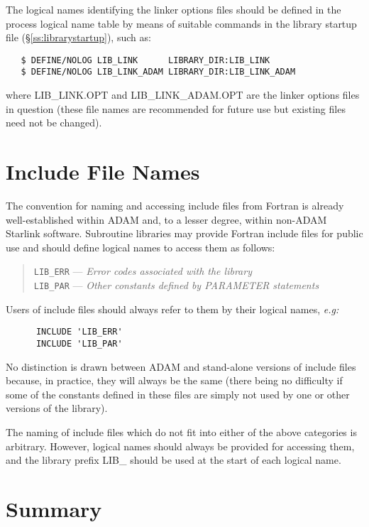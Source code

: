 The logical names identifying the linker options files should be defined in
the process logical name table by means of suitable commands in the library
startup file (\S\ref{ss:librarystartup}), such as: 

\begin{verbatim}
   $ DEFINE/NOLOG LIB_LINK      LIBRARY_DIR:LIB_LINK
   $ DEFINE/NOLOG LIB_LINK_ADAM LIBRARY_DIR:LIB_LINK_ADAM
\end{verbatim}

where LIB\_LINK.OPT and LIB\_LINK\_ADAM.OPT are the linker options files in
question (these file names are recommended for future use but existing files
need not be changed). 


\section{Include File Names}

The convention for naming and accessing include files from Fortran is
already well-established within ADAM and, to a lesser degree, within
non-ADAM Starlink software. 
Subroutine libraries may provide Fortran include files for public use and 
should define logical names to access them as follows:

\begin{quote}
{\tt LIB\_ERR} --- {\em Error codes associated with the library} \\
{\tt LIB\_PAR} --- {\em Other constants defined by PARAMETER statements}
\end{quote}

Users of include files should always refer to them by their logical names,
{\em e.g:}

\begin{verbatim}
      INCLUDE 'LIB_ERR'
      INCLUDE 'LIB_PAR'
\end{verbatim}

No distinction is drawn between ADAM and stand-alone versions of include
files because, in practice, they will always be the same (there being no
difficulty if some of the constants defined in these files are simply not
used by one or other versions of the library). 

The naming of include files which do not fit into either of the above
categories is arbitrary. 
However, logical names should always be provided for accessing them, and the
library prefix LIB\_ should be used at the start of each logical name.

\newpage
\appendix
\section{Summary}

